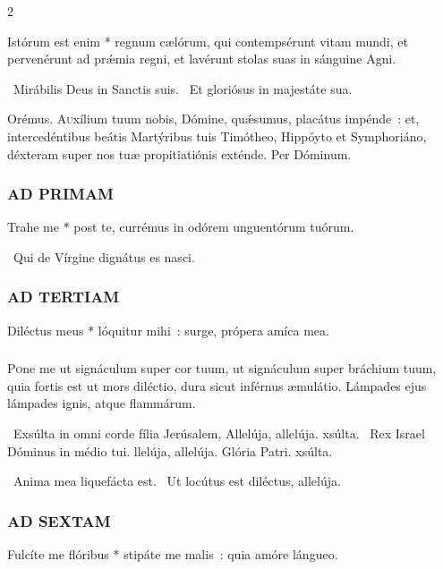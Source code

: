 \documentclass[9pt,twoside]{extarticle}
\begin{document}
\begin{multicols}{2}
\smallskip
{\small {}}

 Istórum est enim * regnum cælórum, qui contempsérunt vitam mundi, et pervenérunt ad prǽmia regni, et lavérunt stolas suas in sánguine Agni.

\smallskip
{}~Mirábilis Deus in Sanctis suis. ~Et gloriósus in majestáte sua.

\smallskip
\noindent Orémus. \hfill {}
\lettrine{A}uxílium tuum nobis, Dómine, quǽsumus, placátus impénde~: et, intercedéntibus beátis Martýribus tuis Timótheo, Hippóyto et Symphoriáno, déxteram super nos tuæ propitiatiónis exténde. Per Dóminum.


\subsubsection*{\center \normalfont \textsc{AD PRIMAM}}
 Trahe me * post te, currémus in odórem unguentórum tuórum.

{\small {}~Qui de Vírgine dignátus es nasci.}

\subsubsection*{\center \normalfont \textsc{AD TERTIAM}}
 Diléctus meus * lóquitur mihi~: surge, própera amíca mea.

\smallskip
\subsubsection*{\normalfont {}}
\lettrine{P}{o}ne me ut signáculum super cor tuum, ut signáculum super bráchium tuum, quia fortis est ut mors diléctio, dura sicut inférnus æmulátio. Lámpades ejus lámpades ignis, atque flammárum.

~Exsúlta in omni corde fília Jerúsalem, \textred{*} Allelúja, allelúja. xsúlta.
~Rex Israel Dóminus in médio tui. llelúja, allelúja.
Glória Patri. xsúlta.

~Anima mea liquefácta est. ~Ut locútus est diléctus, allelúja.

\subsubsection*{\center \normalfont \textsc{AD SEXTAM}}
 Fulcíte me flóribus * stipáte me malis~: quia amóre lángueo.


\end{multicols}
\end{document}
